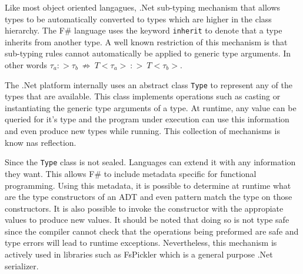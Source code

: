 \documentclass{sigplanconf}
\begin{document}
Like most object oriented langagues, .Net sub-typing mechanism that allows types to be automatically converted to types which are higher in the class hierarchy. The F\# language uses the keyword \verb+inherit+ to denote that a type inherits from another type. A well known restriction of this mechanism is that sub-typing rules cannot automatically be applied to generic type arguments. In other words $\tau_a :> \tau_b\ \not\Rightarrow\ T<\tau_a> \ :> \ T<\tau_b>$.

The .Net platform internally uses an abstract class \verb+Type+ to represent any of the types that are available. This class implements operations such as casting or instantiating the generic type arguments of a type. At runtime, any value can be queried for it's type and the program under execution can use this information and even produce new types while running. This collection of mechanisms is know nas reflection.

Since the \verb+Type+ class is not sealed. Languages can extend it with any information they want. This allows F\# to include metadata specific for functional programming. Using this metadata, it is possible to determine at runtime what are the type constructors of an ADT and even pattern match the type on those constructors. It is also possible to invoke the constructor with the appropiate values to produce new values. It should be noted that doing so is not type safe since the compiler cannot check that the operations being preformed are safe and type errors will lead to runtime exceptions. Nevertheless, this mechanism is actively used in libraries such as FsPickler \cite{FsPickler} which is a general purpose .Net serializer.
\end{document}
